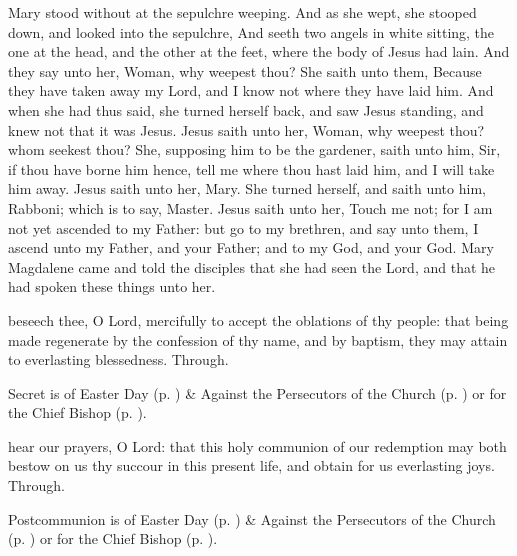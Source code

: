  Mary stood without at the sepulchre weeping. And as she wept, she stooped down, and looked into the sepulchre, And seeth two angels in white sitting, the one at the head, and the other at the feet, where the body of Jesus had lain. And they say unto her, Woman, why weepest thou? She saith unto them, Because they have taken away my Lord, and I know not where they have laid him. And when she had thus said, she turned herself back, and saw Jesus standing, and knew not that it was Jesus. Jesus saith unto her, Woman, why weepest thou? whom seekest thou? She, supposing him to be the gardener, saith unto him, Sir, if thou have borne him hence, tell me where thou hast laid him, and I will take him away. Jesus saith unto her, Mary. She turned herself, and saith unto him, Rabboni; which is to say, Master. Jesus saith unto her, Touch me not; for I am not yet ascended to my Father: but go to my brethren, and say unto them, I ascend unto my Father, and your Father; and to my God, and your God. Mary Magdalene came and told the disciples that she had seen the Lord, and that he had spoken these things unto her.


\secret
{} beseech thee, O Lord, mercifully to accept the oblations of thy people: that being made regenerate by the confession of thy name, and by baptism, they may attain to everlasting blessedness. Through.
\begin{rubric}
     Secret is of Easter Day (p. \pageref{EasterSecret}) \&  Against the Persecutors of the Church (p. \pageref{SPAgainst}) or for the Chief Bishop (p. \pageref{SPChiefBishop}).
\end{rubric}


\postcommunion
{} hear our prayers, O Lord: that this holy communion of our redemption may both bestow on us thy succour in this present life, and obtain for us everlasting joys. Through.
\begin{rubric}
     Postcommunion is of Easter Day (p. \pageref{EasterPostcommunion}) \&  Against the Persecutors of the Church (p. \pageref{SPAgainst}) or for the Chief Bishop (p. \pageref{SPChiefBishop}).
\end{rubric}


